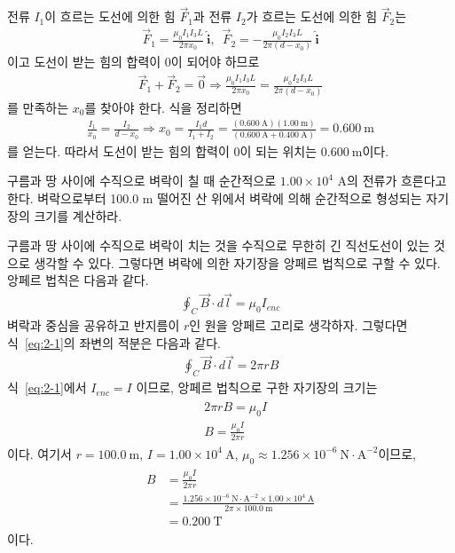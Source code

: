 \documentclass[tightenlines,floatfix,nofootinbib,superscriptaddress,fleqn]{revtex4}
\begin{document}
전류 $I_1$이 흐르는 도선에 의한 힘 $\vec{F}_1$과 전류 $I_2$가 흐르는 도선에 의한 힘 
$\vec{F}_2$는
\begin{align}
  \vec{F}_1 = \frac{\mu_0I_1 I_3 L}{2\pi x_0}~\hat{\bm i},\,\,\,
  \vec{F}_2 =-\frac{\mu_0I_2 I_3 L}{2\pi (d-x_0)}~\hat{\bm i}
\end{align}
이고 도선이 받는 힘의 합력이 0이 되어야 하므로
\begin{align}
  \vec{F}_1+\vec{F}_2=\vec{0} \Longrightarrow
  \frac{\mu_0I_1 I_3 L}{2\pi x_0}=\frac{\mu_0I_2 I_3 L}{2\pi (d-x_0)}
\end{align}
를 만족하는 $x_0$를 찾아야 한다. 식을 정리하면
\begin{align}
  \frac{I_1}{x_0}=\frac{I_2}{d-x_0}\Longrightarrow
  x_0 = \frac{I_1d}{I_1+I_2} = \frac{(0.600~\mathrm{A})(1.00~\mathrm{m})}
  {(0.600~\mathrm{A}+0.400~\mathrm{A})}=0.600~\mathrm{m}
\end{align}
를 얻는다. 따라서 도선이 받는 힘의 합력이 0이 되는 위치는 $0.600~\mathrm{m}$이다.
\vspace{1cm}

구름과 땅 사이에 수직으로 벼락이 칠 때 순간적으로 $1.00\times 10^4$
A의 전류가 흐른다고 한다. 벼락으로부터 100.0 m 떨어진 산 위에서 벼락에
의해 순간적으로 형성되는 자기장의 크기를 계산하라.

\vspace{1.cm}
구름과 땅 사이에 수직으로 벼락이 치는 것을 수직으로 무한히 긴 직선도선이
있는 것으로 생각할 수 있다. 그렇다면 벼락에 의한 자기장을 앙페르 법칙으로 
구할 수 있다. 앙페르 법칙은 다음과 같다.
\begin{align}
  \oint_{C} \vec{B}\cdot d\vec{l}=\mu_0 I_{enc}
  \label{eq:2-1}
\end{align}
벼락과 중심을 공유하고 반지름이 $r$인 원을 앙페르 고리로 생각하자. 
그렇다면 식~\ref{eq:2-1}의 좌변의 적분은 다음과 같다.
\begin{align}
  \oint_{C} \vec{B}\cdot d\vec{l}=2\pi rB
  \label{eq:2-2}
\end{align}
식~\ref{eq:2-1}에서 $I_{enc}=I$ 이므로, 앙페르 법칙으로 구한 자기장의
크기는
\begin{align}
  \begin{split}
    &2\pi rB=\mu_0 I\\
    &B=\frac{\mu_0 I}{2\pi r}
  \end{split}
  \label{eq:2-3}
\end{align}
이다. 여기서 $r=100.0~\mathrm{m}$, $I=1.00\times 10^4~\mathrm{A}$,
$\mu_0\approx 1.256\times 10^{−6}~\mathrm{N\cdot A^{-2}}$이므로,
\begin{align}
  \begin{split}
    B&=\frac{\mu_0 I}{2\pi r}\\
    &=\frac{1.256\times 10^{−6}~\mathrm{N\cdot A^{-2}} \times 1.00\times 10^4~\mathrm{A}}{2\pi \times 100.0~\mathrm{m}}\\
    &=0.200~\mathrm{T}
  \end{split}
  \label{eq:2-4}
\end{align}
이다.
\end{document}
